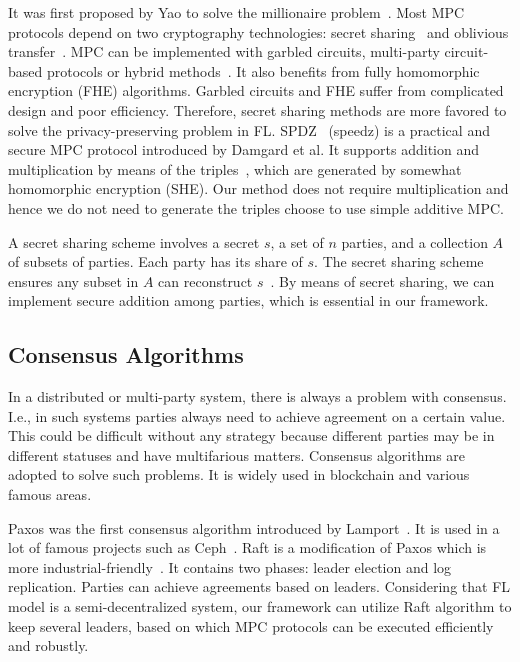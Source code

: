 It was first proposed by Yao to solve the millionaire problem~\cite{Yao}. Most MPC protocols depend on two cryptography technologies: secret sharing~\cite{Shamir} and oblivious transfer~\cite{OT}. MPC can be implemented with garbled circuits, multi-party circuit-based protocols or hybrid methods~\cite{mpc-sok}. It also benefits from fully homomorphic encryption (FHE) algorithms. Garbled circuits and FHE suffer from complicated design and poor efficiency. Therefore, secret sharing methods are more favored to solve the privacy-preserving problem in FL. SPDZ~\cite{SPDZ} (speedz) is a practical and secure MPC protocol introduced by Damgard et al. It supports addition and multiplication by means of the triples~\cite{Triple}, which are generated by somewhat homomorphic encryption (SHE). Our method does not require multiplication and hence we do not need to generate the triples choose to use simple additive MPC.

A secret sharing scheme involves a secret $s$, a set of $n$ parties, and a collection $A$ of subsets of parties. Each party has its share of $s$. The secret sharing scheme ensures any subset in $A$ can reconstruct $s$~\cite{Secret-Sharing-survey}. By means of secret sharing, we can implement secure addition among parties, which is essential in our framework.


\subsection{Consensus Algorithms}
In a distributed or multi-party system, there is always a problem with consensus. I.e., in such systems parties always need to achieve agreement on a certain value. This could be difficult without any strategy because different parties may be in different statuses and have multifarious matters. Consensus algorithms are adopted to solve such problems. It is widely used in blockchain and various famous areas.

Paxos was the first consensus algorithm introduced by Lamport~\cite{Paxos}. It is used in a lot of famous projects such as Ceph~\cite{Ceph}. Raft is a modification of Paxos which is more industrial-friendly~\cite{Raft}. It contains two phases: leader election and log replication. Parties can achieve agreements based on leaders. Considering that FL model is a semi-decentralized system, our framework can utilize Raft algorithm to keep several leaders, based on which MPC protocols can be executed efficiently and robustly.
